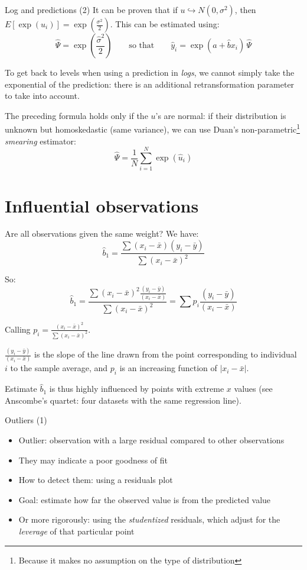 \documentclass[aspectratio=169]{beamer}
\begin{document}
\begin{frame}{Log and predictions (2)}
It can be proven that if $u \hookrightarrow N(0,\sigma^2)$, then $E[\exp(u_i)] = \exp(\frac{\sigma^2}{2})$. This can be estimated using:
\[
\hat{\Psi} = \exp\left(\frac{\hat{\sigma}^2}{2}\right)
\qquad \text{so that} \qquad
\hat{y}_i = \exp(\hat{a} + \hat{b}x_i)\,\hat{\Psi}
\]

To get back to levels when using a prediction in \textit{logs}, we cannot simply take the exponential of the prediction: there is an additional retransformation parameter to take into account.

The preceding formula holds only if the $u$'s are normal: if their distribution is unknown but homoskedastic (same variance), we can use Duan's non-parametric\footnote{Because it makes no assumption on the type of distribution} \textit{smearing} estimator:
\[
\hat{\Psi} = \frac{1}{N}\sum_{i=1}^{N} \exp(\hat{u}_i)
\]
\end{frame}

\section{Influential observations}

\begin{frame}{Are all observations given the same weight?}
We have:
\[\hat{b}_1 = \frac{\sum(x_i - \bar{x})(y_i - \bar{y})}{\sum(x_i - \bar{x})^2}\]

So:
\[\hat{b}_1 = \frac{\sum(x_i - \bar{x})^2 \frac{(y_i-\bar{y})}{(x_i-\bar{x})}}{\sum(x_i - \bar{x})^2} = \sum p_i\frac{(y_i - \bar{y})}{(x_i - \bar{x})}\]

Calling $p_i = \frac{(x_i - \bar{x})^2}{\sum(x_i - \bar{x})^2}$.

$\frac{(y_i-\bar{y})}{(x_i-\bar{x})}$ is the slope of the line drawn from the point corresponding to individual $i$ to the sample average, and $p_i$ is an increasing function of $|x_i - \bar{x}|$.

Estimate $\hat{b}_1$ is thus highly influenced by points with extreme $x$ values (see Anscombe's quartet: four datasets with the same regression line).
\end{frame}

\begin{frame}{Outliers (1)}
\begin{itemize}
    \item Outlier: observation with a large residual compared to other observations
    \item They may indicate a poor goodness of fit
    \item How to detect them: using a residuals plot
    \item Goal: estimate how far the observed value is from the predicted value
    \item Or more rigorously: using the \textit{studentized} residuals, which adjust for the \textit{leverage} of that particular point
\end{itemize}
\end{frame}
\end{document}
